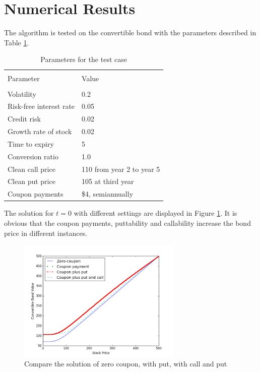 \documentclass[12pt]{article}
\begin{document}
\section{Numerical Results}
The algorithm is tested on the convertible bond with the parameters described in Table \ref{tb:params}.
\begin{table}
\centering
\begin{tabular}{ll}
\hline\hline\\
Parameter &  Value \\
\hline\\
Volatility & 0.2 \\
Risk-free interest rate & 0.05\\
Credit risk & 0.02\\
Growth rate of stock & 0.02\\
Time to expiry & 5 \\
Conversion ratio & 1.0 \\
Clean call price & 110 from year 2 to year 5\\
Clean put price & 105 at third year\\
Coupon payments & \$4, semiannually\\
\hline
\end{tabular}
\caption{Parameters for the test case}
\label{tb:params}
\end{table}


The solution for $t = 0$ with different settings are displayed in Figure \ref{fig:compare}. It is obvious that the coupon payments, puttability and callability increase the bond price in different instances.
\begin{figure}[!htpb]
\centering
\includegraphics[width=0.7\textwidth]{Figures/compare}
\caption{Compare the solution of zero coupon, with put, with call and put}
\label{fig:compare}
\end{figure}
\end{document}
